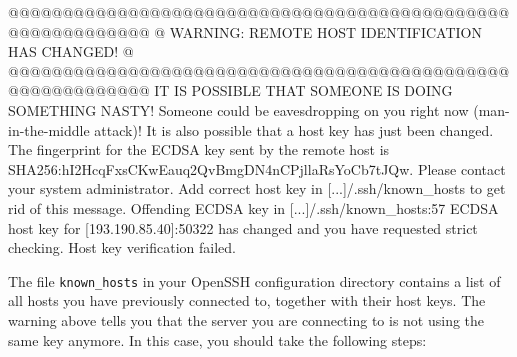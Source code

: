 \begin{prompt}
@@@@@@@@@@@@@@@@@@@@@@@@@@@@@@@@@@@@@@@@@@@@@@@@@@@@@@@@@@@
@    WARNING: REMOTE HOST IDENTIFICATION HAS CHANGED!     @
@@@@@@@@@@@@@@@@@@@@@@@@@@@@@@@@@@@@@@@@@@@@@@@@@@@@@@@@@@@
IT IS POSSIBLE THAT SOMEONE IS DOING SOMETHING NASTY!
Someone could be eavesdropping on you right now (man-in-the-middle attack)!
It is also possible that a host key has just been changed.
The fingerprint for the ECDSA key sent by the remote host is
SHA256:hI2HcqFxsCKwEauq2QvBmgDN4nCPjllaRsYoCb7tJQw.
Please contact your system administrator.
Add correct host key in [...]/.ssh/known_hosts to get rid of this message.
Offending ECDSA key in [...]/.ssh/known_hosts:57
ECDSA host key for [193.190.85.40]:50322 has changed and you have requested strict checking.
Host key verification failed.
\end{prompt}

The file \lstinline{known_hosts} in your OpenSSH configuration
directory contains a list of all hosts you have previously connected
to, together with their host keys.  The warning above tells you that
the server you are connecting to is not using the same key anymore.
In this case, you should take the following steps:

